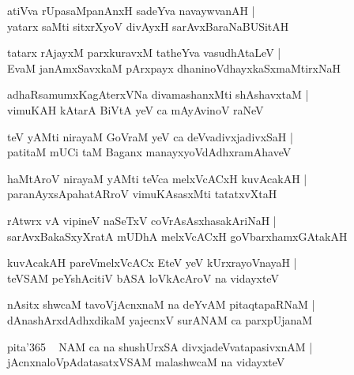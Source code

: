 \documentclass[twoside,12pt,openright]{book}
\newcounter{shloka}[chapter]
\begin{document}
\begin{shloka}%
atiVva rUpasaMpanAnxH sadeYva navaywvanAH |\\
yatarx saMti sitxrXyoV divAyxH sarAvxBaraNaBUSitAH 
\end{shloka}

\begin{shloka}%
tatarx rAjayxM parxkuravxM tatheYva vasudhAtaLeV |\\
EvaM janAmxSavxkaM pArxpayx dhaninoVdhayxkaSxmaMtirxNaH
\end{shloka}

\begin{shloka}%
adhaRsamumxKagAterxVNa divamashanxMti shAshavxtaM |\\
vimuKAH kAtarA BiVtA yeV ca mAyAvinoV raNeV 
\end{shloka}

\begin{shloka}%
teV yAMti nirayaM GoVraM yeV ca deVvadivxjadivxSaH |\\
patitaM mUCi taM Baganx manayxyoVdAdhxramAhaveV 
\end{shloka}

\begin{shloka}%
haMtAroV nirayaM yAMti teVca melxVcACxH kuvAcakAH |\\
paranAyxsApahatARroV vimuKAsasxMti tatatxvXtaH 
\end{shloka}

\begin{shloka}%
rAtwrx vA vipineV naSeTxV coVrAsAsxhasakAriNaH |\\
sarAvxBakaSxyXratA mUDhA melxVcACxH goVbarxhamxGAtakAH 
\end{shloka}

\begin{shloka}%
kuvAcakAH pareVmelxVcACx EteV yeV kUrxrayoVnayaH |\\
teVSAM peYshAcitiV bASA loVkAcAroV na vidayxteV 
\end{shloka}

\begin{shloka}%
nAsitx shwcaM tavoVjAcnxnaM na deYvAM pitaqtapaRNaM |\\
dAnashArxdAdhxdikaM yajecnxV surANAM ca parxpUjanaM 
\end{shloka}

\begin{shloka}%
pita\char'365 ~ NAM ca na shushUrxSA divxjadeVvatapasivxnAM |\\
jAcnxnaloVpAdatasatxVSAM malashwcaM na vidayxteV 
\end{shloka}
\end{document}
